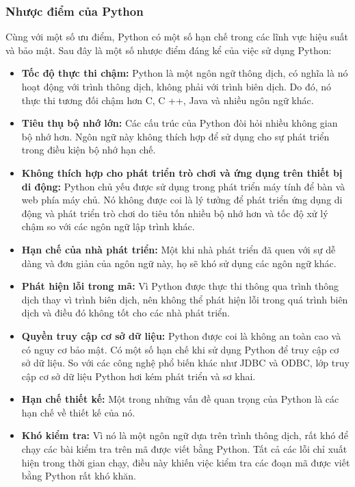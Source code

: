 \documentclass{article} %
\begin{document}
\subsubsection{Nhược điểm của Python}
Cùng với một số ưu điểm, Python có một số hạn chế trong các lĩnh vực hiệu suất và bảo mật. Sau đây là một số nhược điểm đáng kể của việc sử dụng Python:
\begin{itemize}
    \item \textbf{Tốc độ thực thi chậm:} Python là một ngôn ngữ thông dịch, có nghĩa là nó hoạt động với trình thông dịch, không phải với trình biên dịch. Do đó, nó thực thi tương đối chậm hơn C, C ++, Java và nhiều ngôn ngữ khác.
    \item \textbf{Tiêu thụ bộ nhớ lớn:} Các cấu trúc của Python đòi hỏi nhiều không gian bộ nhớ hơn. Ngôn ngữ này không thích hợp để sử dụng cho sự phát triển trong điều kiện bộ nhớ hạn chế.
    \item \textbf{Không thích hợp cho phát triển trò chơi và ứng dụng trên thiết bị di động:} Python chủ yếu được sử dụng trong phát triển máy tính để bàn và web phía máy chủ. Nó không được coi là lý tưởng để phát triển ứng dụng di động và phát triển trò chơi do tiêu tốn nhiều bộ nhớ hơn và tốc độ xử lý chậm so với các ngôn ngữ lập trình khác.
    \item \textbf{Hạn chế của nhà phát triển:} Một khi nhà phát triển đã quen với sự dễ dàng và đơn giản của ngôn ngữ này, họ sẽ khó sử dụng các ngôn ngữ khác.
    \item \textbf{Phát hiện lỗi trong mã:} Vì Python được thực thi thông qua trình thông dịch thay vì trình biên dịch, nên không thể phát hiện lỗi trong quá trình biên dịch và điều đó không tốt cho các nhà phát triển.
    \item \textbf{Quyền truy cập cơ sở dữ liệu:} Python được coi là không an toàn cao và có nguy cơ bảo mật. Có một số hạn chế khi sử dụng Python để truy cập cơ sở dữ liệu. So với các công nghệ phổ biến khác như JDBC và ODBC, lớp truy cập cơ sở dữ liệu Python hơi kém phát triển và sơ khai.
    \item \textbf{Hạn chế thiết kế:} Một trong những vấn đề quan trọng của Python là các hạn chế về thiết kế của nó.
    \item \textbf{Khó kiểm tra:} Vì nó là một ngôn ngữ dựa trên trình thông dịch, rất khó để chạy các bài kiểm tra trên mã được viết bằng Python. Tất cả các lỗi chỉ xuất hiện trong thời gian chạy, điều này khiến việc kiểm tra các đoạn mã được viết bằng Python rất khó khăn.
\end{itemize}
\end{document}

